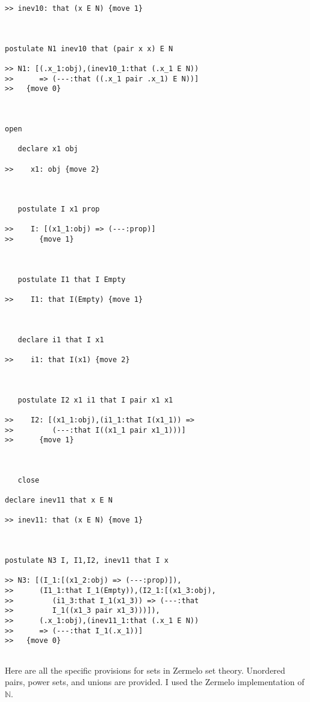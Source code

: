 \documentclass{article}
\begin{document}
\begin{verbatim}
>> inev10: that (x E N) {move 1}



postulate N1 inev10 that (pair x x) E N

>> N1: [(.x_1:obj),(inev10_1:that (.x_1 E N))
>>      => (---:that ((.x_1 pair .x_1) E N))]
>>   {move 0}



open

   declare x1 obj

>>    x1: obj {move 2}



   postulate I x1 prop

>>    I: [(x1_1:obj) => (---:prop)]
>>      {move 1}



   postulate I1 that I Empty

>>    I1: that I(Empty) {move 1}



   declare i1 that I x1

>>    i1: that I(x1) {move 2}



   postulate I2 x1 i1 that I pair x1 x1

>>    I2: [(x1_1:obj),(i1_1:that I(x1_1)) =>
>>         (---:that I((x1_1 pair x1_1)))]
>>      {move 1}



   close

declare inev11 that x E N

>> inev11: that (x E N) {move 1}



postulate N3 I, I1,I2, inev11 that I x

>> N3: [(I_1:[(x1_2:obj) => (---:prop)]),
>>      (I1_1:that I_1(Empty)),(I2_1:[(x1_3:obj),
>>         (i1_3:that I_1(x1_3)) => (---:that
>>         I_1((x1_3 pair x1_3)))]),
>>      (.x_1:obj),(inev11_1:that (.x_1 E N))
>>      => (---:that I_1(.x_1))]
>>   {move 0}


\end{verbatim}

Here are all the specific provisions for sets in Zermelo set theory.  Unordered pairs, power sets, and unions are provided.  I used the Zermelo implementation of $\mathbb N$.
\end{document}
